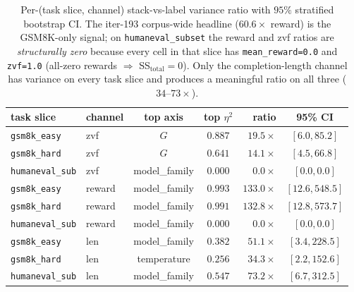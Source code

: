 \begin{table}[t]
\centering\small
\caption{Per-(task slice, channel) stack-vs-label variance ratio with
$95\%$ stratified bootstrap CI. The iter-193 corpus-wide headline
($60.6\times$ reward) is the GSM8K-only signal; on
\texttt{humaneval\_subset} the reward and zvf ratios are
\emph{structurally zero} because every cell in that slice has
\texttt{mean\_reward=0.0} and \texttt{zvf=1.0} (all-zero rewards
$\Rightarrow$ SS$_{\text{total}}=0$). Only the completion-length
channel has variance on every task slice and produces a meaningful
ratio on all three ($34$--$73\times$).}
\label{tab:p5-iter201-per-task}
\begin{tabular}{llccrc}
\toprule
task slice & channel & top axis & top $\eta^2$ & ratio & 95\% CI \\
\midrule
\texttt{gsm8k\_easy}      & zvf    & $G$             & $0.887$ & $19.5\times$  & $[6.0, 85.2]$ \\
\texttt{gsm8k\_hard}      & zvf    & $G$             & $0.641$ & $14.1\times$  & $[4.5, 66.8]$ \\
\texttt{humaneval\_sub}   & zvf    & model\_family   & $0.000$ & $0.0\times$   & $[0.0, 0.0]$ \\
\midrule
\texttt{gsm8k\_easy}      & reward & model\_family   & $0.993$ & $133.0\times$ & $[12.6, 548.5]$ \\
\texttt{gsm8k\_hard}      & reward & model\_family   & $0.991$ & $132.8\times$ & $[12.8, 573.7]$ \\
\texttt{humaneval\_sub}   & reward & model\_family   & $0.000$ & $0.0\times$   & $[0.0, 0.0]$ \\
\midrule
\texttt{gsm8k\_easy}      & len    & model\_family   & $0.382$ & $51.1\times$  & $[3.4, 228.5]$ \\
\texttt{gsm8k\_hard}      & len    & temperature     & $0.256$ & $34.3\times$  & $[2.2, 152.6]$ \\
\texttt{humaneval\_sub}   & len    & model\_family   & $0.547$ & $73.2\times$  & $[6.7, 312.5]$ \\
\bottomrule
\end{tabular}
\end{table}

